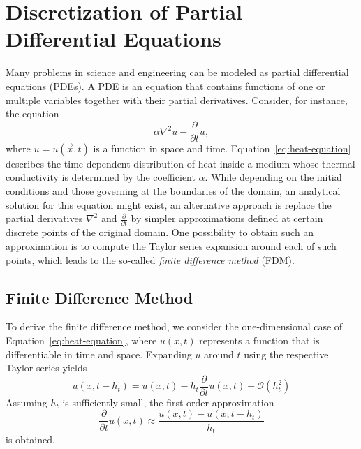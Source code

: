 \section{Discretization of Partial Differential Equations}
Many problems in science and engineering can be modeled as partial differential equations (PDEs). %
A PDE is an equation that contains functions of one or multiple variables together with their partial derivatives.
Consider, for instance, the equation
\begin{equation}
	\alpha \nabla^2 u - \frac{\partial }{\partial t} u,
	\label{eq:heat-equation}
\end{equation}
where $u = u(\vec{x}, t)$ is a function in space and time.
Equation~\eqref{eq:heat-equation} describes the time-dependent distribution of heat inside a medium whose thermal conductivity is determined by the coefficient $\alpha$.
While depending on the initial conditions and those governing at the boundaries of the domain, an analytical solution for this equation might exist, an alternative approach is replace the partial derivatives $\nabla^2$ and $\frac{\partial }{\partial t}$ by simpler approximations defined at certain discrete points of the original domain.
One possibility to obtain such an approximation is to compute the Taylor series expansion around each of such points, which leads to the so-called \emph{finite difference method} (FDM).
\subsection{Finite Difference Method}
To derive the finite difference method, we consider the one-dimensional case of Equation~\ref{eq:heat-equation}, where $u(x,t)$ represents a function that is differentiable in time and space.
Expanding $u$ around $t$ using the respective Taylor series yields
\begin{equation}
	u(x, t - h_t) = u(x, t) - h_t \frac{\partial}{\partial t} u(x,t) + \mathcal{O}(h_t^2)
\end{equation}
Assuming $h_t$ is sufficiently small, the first-order approximation 
\begin{equation}
	\frac{\partial}{\partial t} u(x, t) \approx \frac{u(x, t) -  u(x, t - h_t)}{h_t}
\end{equation}
is obtained.
